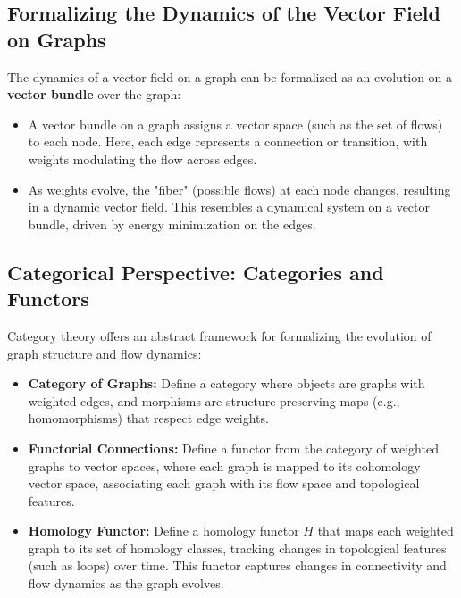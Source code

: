 \documentclass[10pt,a4paper,twocolumn]{article}
\begin{document}
	\subsection{Formalizing the Dynamics of the Vector Field on Graphs}
	The dynamics of a vector field on a graph can be formalized as an evolution on a \textbf{vector bundle} over the graph:
	\begin{itemize}
		\item A vector bundle on a graph assigns a vector space (such as the set of flows) to each node. Here, each edge represents a connection or transition, with weights modulating the flow across edges.
		\item As weights evolve, the "fiber" (possible flows) at each node changes, resulting in a dynamic vector field. This resembles a dynamical system on a vector bundle, driven by energy minimization on the edges.
	\end{itemize}
	
	\subsection{Categorical Perspective: Categories and Functors}
	Category theory offers an abstract framework for formalizing the evolution of graph structure and flow dynamics:
	\begin{itemize}
		\item \textbf{Category of Graphs:} Define a category where objects are graphs with weighted edges, and morphisms are structure-preserving maps (e.g., homomorphisms) that respect edge weights.
		\item \textbf{Functorial Connections:} Define a functor from the category of weighted graphs to vector spaces, where each graph is mapped to its cohomology vector space, associating each graph with its flow space and topological features.
		\item \textbf{Homology Functor:} Define a homology functor \( H \) that maps each weighted graph to its set of homology classes, tracking changes in topological features (such as loops) over time. This functor captures changes in connectivity and flow dynamics as the graph evolves.
	\end{itemize}
	
\end{document}

